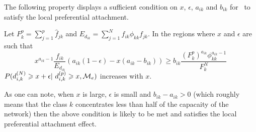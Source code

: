 The following property displays a sufficient condition on $x$, $\epsilon$, $a_{ik}$ and $b_{ik}$ for \imb\ to satisfy the local preferential attachment.

\begin{proposition}\label{prop:IMBlocal}
Let $F_k^p = \sum_{j=1}^p \hat{f}_{jk}$ and $E_{d_{ik}}=\sum_{j=1}^N f_{ik}\phi_{kk}f_{jk}$. In the regions where $x$ and $\epsilon$ are such that
\begin{equation*}
x^{a_{ik}-1}\frac{f_{ik}}{E_{d_{ik}}}\left(a_{ik}(1-\epsilon) -x(a_{ik}-b_{ik}) \right) \geq b_{ik}\frac{(F_k^p)^{a_{ik}}\phi_{kk}^{a_{ik}-1}}{F_k^N}
\end{equation*}
$P(d_{i,k}^{(N)} \geq x+\epsilon | d_{i,k}^{(p)} \geq x,\M_e)$ increases with $x$.
\end{proposition}

As one can note, when $x$ is large, $\epsilon$ is small and $b_{ik}-a_{ik}>0$ (which roughly means that the class $k$ concentrates less than half of the capacaity of the network) then the above condition is likely to be met and \imb satisfies the local preferential attachment effect. 

